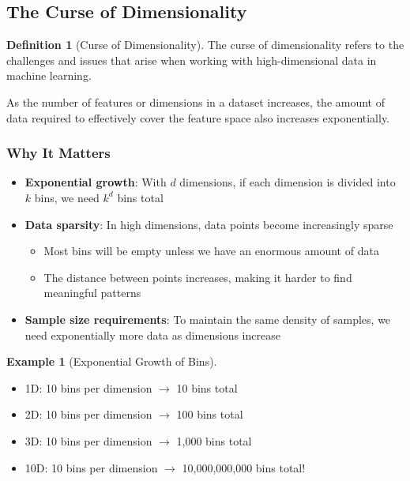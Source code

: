 \documentclass[11pt,a4paper]{article}
\theoremstyle{definition}
\newtheorem{definition}{Definition}[section]
\newtheorem{example}{Example}[section]
\theoremstyle{plain}
\theoremstyle{remark}
\begin{document}
\subsection{The Curse of Dimensionality}

\begin{definition}[Curse of Dimensionality]
The curse of dimensionality refers to the challenges and issues that arise when working with high-dimensional data in machine learning.

As the number of features or dimensions in a dataset increases, the amount of data required to effectively cover the feature space also increases exponentially.
\end{definition}

\subsubsection{Why It Matters}

\begin{itemize}
    \item \textbf{Exponential growth}: With $d$ dimensions, if each dimension is divided into $k$ bins, we need $k^d$ bins total
    
    \item \textbf{Data sparsity}: In high dimensions, data points become increasingly sparse
    \begin{itemize}
        \item Most bins will be empty unless we have an enormous amount of data
        \item The distance between points increases, making it harder to find meaningful patterns
    \end{itemize}
    
    \item \textbf{Sample size requirements}: To maintain the same density of samples, we need exponentially more data as dimensions increase
\end{itemize}

\begin{example}[Exponential Growth of Bins]
\begin{itemize}
    \item 1D: 10 bins per dimension $\rightarrow$ 10 bins total
    \item 2D: 10 bins per dimension $\rightarrow$ 100 bins total
    \item 3D: 10 bins per dimension $\rightarrow$ 1,000 bins total
    \item 10D: 10 bins per dimension $\rightarrow$ 10,000,000,000 bins total!
\end{itemize}
\end{example}
\end{document}
